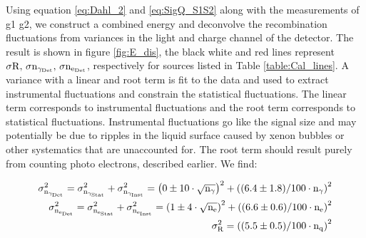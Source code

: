 
Using equation \ref{eq:Dahl_2} and \ref{eq:SigQ_S1S2} along with the measurements of g1 g2, we construct a combined energy and deconvolve the recombination fluctuations from variances in the light and charge channel of the detector. The result is shown in figure \ref{fig:E_dis}, the black white and red lines represent $\rm \sigma R, \, \sigma n_{\gamma_{Det}}, \,\sigma n_{e_{Det}}$, respectively for sources listed in Table \ref{table:Cal_lines}. A variance with a linear and root term is fit to the data and used to extract instrumental fluctuations and constrain the statistical fluctuations. The linear term corresponds to instrumental fluctuations and the root term corresponds to statistical fluctuations. Instrumental fluctuations go like the signal size and may potentially be due to ripples in the liquid surface caused by xenon bubbles or other systematics that are unaccounted for. The root term should result purely from counting photo electrons, described earlier. We find:


\begin{equation}
\begin{split}
\rm  \sigma_{n_{\gamma_{Det}}}^2 = \sigma_{n_{\gamma_{Stat}}}^2 + \sigma_{n_{\gamma_{Inst}}}^2 =\left(0 \pm10\cdot \sqrt{n_\gamma}\right)^2 + \left((6.4\pm1.8)/100\cdot n_\gamma\right)^2 \\
\rm \sigma_{n_{e_{Det}}}^2 = \sigma_{n_{e_{Stat}}}^2 + \sigma_{n_{e_{Inst}}}^2 = \left(1\pm4\cdot \sqrt{n_e}\right)^2 + \left((6.6\pm0.6)/100\cdot n_e\right)^2 \\
\rm \sigma_R^2=   \left((5.5\pm0.5)/100\cdot n_q\right)^2
\label{eq:Inst_Fit}
\end{split}
\end{equation}

